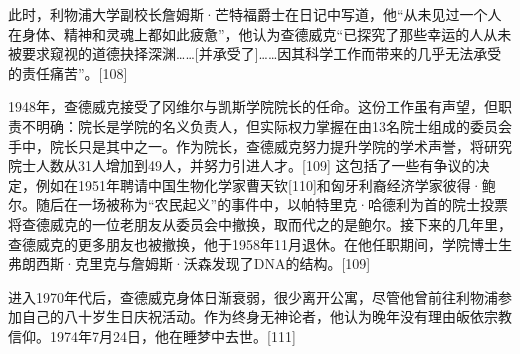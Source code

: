 此时，利物浦大学副校长詹姆斯·芒特福爵士在日记中写道，他“从未见过一个人在身体、精神和灵魂上都如此疲惫”，他认为查德威克“已探究了那些幸运的人从未被要求窥视的道德抉择深渊……[并承受了]……因其科学工作而带来的几乎无法承受的责任痛苦”。[108]

1948年，查德威克接受了冈维尔与凯斯学院院长的任命。这份工作虽有声望，但职责不明确：院长是学院的名义负责人，但实际权力掌握在由13名院士组成的委员会手中，院长只是其中之一。作为院长，查德威克努力提升学院的学术声誉，将研究院士人数从31人增加到49人，并努力引进人才。[109] 这包括了一些有争议的决定，例如在1951年聘请中国生物化学家曹天钦[110]和匈牙利裔经济学家彼得·鲍尔。随后在一场被称为“农民起义”的事件中，以帕特里克·哈德利为首的院士投票将查德威克的一位老朋友从委员会中撤换，取而代之的是鲍尔。接下来的几年里，查德威克的更多朋友也被撤换，他于1958年11月退休。在他任职期间，学院博士生弗朗西斯·克里克与詹姆斯·沃森发现了DNA的结构。[109]

进入1970年代后，查德威克身体日渐衰弱，很少离开公寓，尽管他曾前往利物浦参加自己的八十岁生日庆祝活动。作为终身无神论者，他认为晚年没有理由皈依宗教信仰。1974年7月24日，他在睡梦中去世。[111]